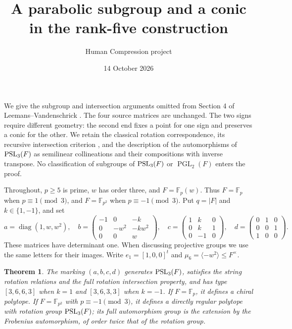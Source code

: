 \documentclass[11pt,a4paper]{article}
\title{A parabolic subgroup and a conic in the rank-five construction}
\author{Human Compression project}\date{14 October 2026}
\newtheorem{theorem}{Theorem}\newtheorem{lemma}[theorem]{Lemma}
\newcommand{\PGL}{\operatorname{PGL}}\newcommand{\GL}{\operatorname{GL}}
\newcommand{\Fp}{\mathbb F_p}\newcommand{\PG}{\operatorname{PG}}
\begin{document}
\maketitle

We give the subgroup and intersection arguments omitted from Section 4 of
Leemans--Vandenschrick \cite{source}. The four source matrices are unchanged.
The two signs require different geometry: the second end fixes a point for
one sign and preserves a conic for the other. We retain the classical
rotation correspondence, its recursive intersection criterion
\cite[Lemmas 2.2 and 2.3]{source}, and the description of the automorphisms
of $\operatorname{PSL}_3(F)$ as semilinear collineations and their compositions with
inverse transpose. No classification of subgroups of $\operatorname{PSL}_3(F)$ or
$\PGL_2(F)$ enters the proof.

Throughout, $p\geq5$ is prime, $w$ has order three, and $F=\Fp(w)$.
Thus $F=\Fp$ when $p\equiv1\pmod3$, and $F=\mathbb F_{p^2}$ when
$p\equiv-1\pmod3$. Put $q=|F|$ and $k\in\{1,-1\}$, and set
\[
 a=\operatorname{diag}(1,w,w^2),\quad
 b=\begin{pmatrix}-1&0&-k\\0&-w^2&-kw^2\\0&0&w\end{pmatrix},\quad
 c=\begin{pmatrix}1&k&0\\0&k&1\\0&-1&0\end{pmatrix},\quad
 d=\begin{pmatrix}0&1&0\\0&0&1\\1&0&0\end{pmatrix}.
\]
These matrices have determinant one. When discussing projective groups we
use the same letters for their images. Write $e_1=[1,0,0]^t$ and
$\mu_6=\langle-w^2\rangle\leq F^\times$.

\begin{theorem}
The marking $(a,b,c,d)$ generates $\operatorname{PSL}_3(F)$, satisfies the string
rotation relations and the full rotation intersection property, and has
type $[3,6,6,3]$ when $k=1$ and $[3,6,3,3]$ when $k=-1$.
If $F=\Fp$, it defines a chiral polytope. If $F=\mathbb F_{p^2}$ with
$p\equiv-1\pmod3$, it defines a directly regular polytope with rotation
group $\operatorname{PSL}_3(F)$; its full automorphism group is the extension by the
Frobenius automorphism, of order twice that of the rotation group.
\end{theorem}
\end{document}
